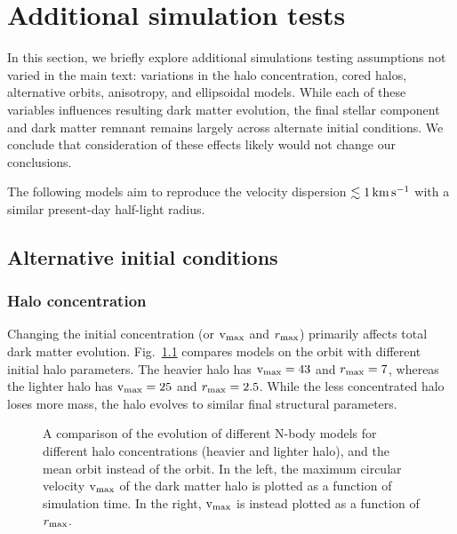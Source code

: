 \chapter{Additional simulation tests}\label{sec:extra_results}

In this section, we briefly explore additional simulations testing
assumptions not varied in the main text: variations in the halo
concentration, cored halos, alternative orbits, anisotropy, and
ellipsoidal models. While each of these variables influences resulting
dark matter evolution, the final stellar component and dark matter
remnant remains largely across alternate initial conditions. We conclude
that consideration of these effects likely would not change our
conclusions.

The following models aim to reproduce the velocity dispersion
\(\lesssim 1\,{\rm km\,s^{-1}}\) with a similar present-day half-light radius.

\section{Alternative initial
conditions}\label{alternative-initial-conditions}

\subsection{Halo concentration}\label{halo-concentration}

Changing the initial concentration (or \({\rm v}_{\rm max}\) and \(r_{\rm max}\))
primarily affects total dark matter evolution.
Fig.~\ref{fig:tidal_tracks_concentration} compares models on the
\smallperi{} orbit with different initial halo parameters. The heavier
halo has \({\rm v}_{\rm max}=43\) and \(r_{\rm max}=7\), whereas the lighter halo has
\({\rm v}_{\rm max}=25\) and \(r_{\rm max}=2.5\). While the less concentrated halo loses
more mass, the halo evolves to similar final structural parameters.

\begin{figure}
\centering
{}
\caption[Tidal dependence on halo concentration]{A comparison of the
evolution of different N-body models for different halo concentrations
(heavier and lighter halo), and the mean orbit instead of the
\smallperi{} orbit. In the left, the maximum circular velocity \({\rm v}_{\rm max}\)
of the dark matter halo is plotted as a function of simulation time. In
the right, \({\rm v}_{\rm max}\) is instead plotted as a function of
\(r_{\rm max}\).}\label{fig:tidal_tracks_concentration}
\end{figure}

